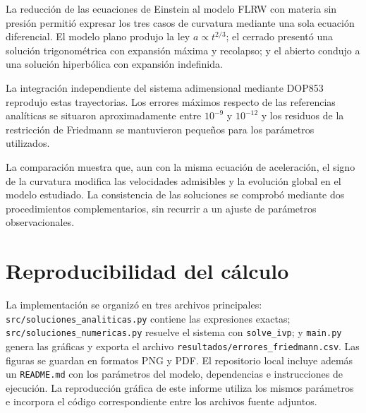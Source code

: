 \documentclass[letterpaper,11pt]{article}
\begin{document}
La reducción de las ecuaciones de Einstein al modelo FLRW con materia sin presión permitió expresar los tres casos de curvatura mediante una sola ecuación diferencial. El modelo plano produjo la ley $a\propto t^{2/3}$; el cerrado presentó una solución trigonométrica con expansión máxima y recolapso; y el abierto condujo a una solución hiperbólica con expansión indefinida.

La integración independiente del sistema adimensional mediante DOP853 reprodujo estas trayectorias. Los errores máximos respecto de las referencias analíticas se situaron aproximadamente entre $10^{-9}$ y $10^{-12}$ y los residuos de la restricción de Friedmann se mantuvieron pequeños para los parámetros utilizados.

La comparación muestra que, aun con la misma ecuación de aceleración, el signo de la curvatura modifica las velocidades admisibles y la evolución global en el modelo estudiado. La consistencia de las soluciones se comprobó mediante dos procedimientos complementarios, sin recurrir a un ajuste de parámetros observacionales.

\section*{Reproducibilidad del cálculo}

La implementación se organizó en tres archivos principales: \texttt{src/soluciones\_analiticas.py} contiene las expresiones exactas; \texttt{src/soluciones\_numericas.py} resuelve el sistema con \texttt{solve\_ivp}; y \texttt{main.py} genera las gráficas y exporta el archivo \texttt{resultados/errores\_friedmann.csv}. Las figuras se guardan en formatos PNG y PDF. El repositorio local incluye además un \texttt{README.md} con los parámetros del modelo, dependencias e instrucciones de ejecución. La reproducción gráfica de este informe utiliza los mismos parámetros e incorpora el código correspondiente entre los archivos fuente adjuntos.

\clearpage
\printbibliography[title={Referencias}]
\end{document}
